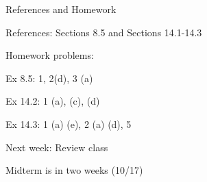 \documentclass{./../../Latex/teaching_slides}
\begin{document}
\begin{frame}{References and Homework}
\begin{witemize}
  \item References: Sections 8.5 and Sections 14.1-14.3
  \item Homework problems: \\
  \begin{witemize}
    \normalsize
  	\item Ex 8.5: 1, 2(d), 3 (a)
  	\item Ex 14.2: 1 (a), (c), (d)
  	\item Ex 14.3: 1 (a) (e), 2 (a) (d), 5
  	\end{witemize}
 \item Next week: Review class
 \item Midterm is in two weeks (10/17)
  	\end{witemize}

\end{frame}
\end{document}
